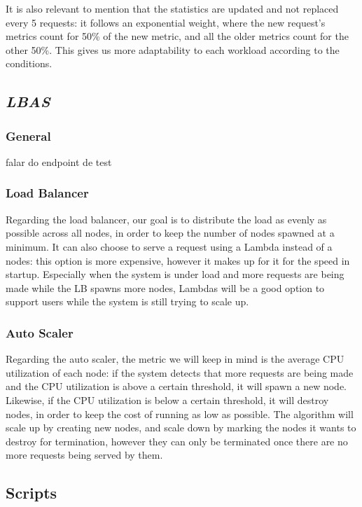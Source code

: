 \documentclass{article}
\begin{document}
It is also relevant to mention that the statistics are updated and not replaced
every 5 requests: it follows an exponential weight, where the new request's
metrics count for 50\% of the new metric, and all the older metrics count for
the other 50\%. This gives us more adaptability to each workload according to
the conditions.

\subsection{\textit{LBAS}}

\subsubsection{General}

falar do endpoint de test

\subsubsection{Load Balancer}

Regarding the load balancer, our goal is to distribute the load as evenly as
possible across all nodes, in order to keep the number of nodes spawned at a
minimum. It can also choose to serve a request using a Lambda instead of a
nodes: this option is more expensive, however it makes up for it for the speed
in startup. Especially when the system is under load and more requests are being
made while the LB spawns more nodes, Lambdas will be a good option to support
users while the system is still trying to scale up.

\subsubsection{Auto Scaler}

Regarding the auto scaler, the metric we will keep in mind is the average CPU
utilization of each node: if the system detects that more requests are being
made and the CPU utilization is above a certain threshold, it will spawn a new
node. Likewise, if the CPU utilization is below a certain threshold, it will
destroy nodes, in order to keep the cost of running as low as possible. The
algorithm will scale up by creating new nodes, and scale down by marking the
nodes it wants to destroy for termination, however they can only be terminated
once there are no more requests being served by them.

\subsection{Scripts}
\end{document}
